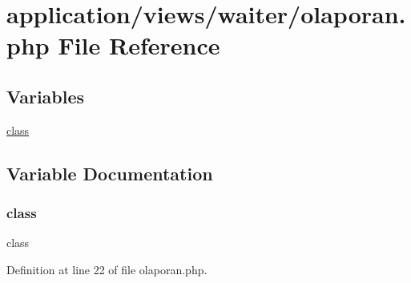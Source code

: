 \hypertarget{waiter_2olaporan_8php}{}\section{application/views/waiter/olaporan.php File Reference}
\label{waiter_2olaporan_8php}
\subsection*{Variables}
\begin{DoxyCompactItemize}
\item 
\mbox{\hyperlink{waiter_2olaporan_8php_a185c73c6507391d1eb38c776b68ce96d}{class}}
\end{DoxyCompactItemize}


\subsection{Variable Documentation}
\mbox{\label{waiter_2olaporan_8php_a185c73c6507391d1eb38c776b68ce96d}} 
\subsubsection{\texorpdfstring{class}{class}}
{\footnotesize\ttfamily class}



Definition at line 22 of file olaporan.\+php.

